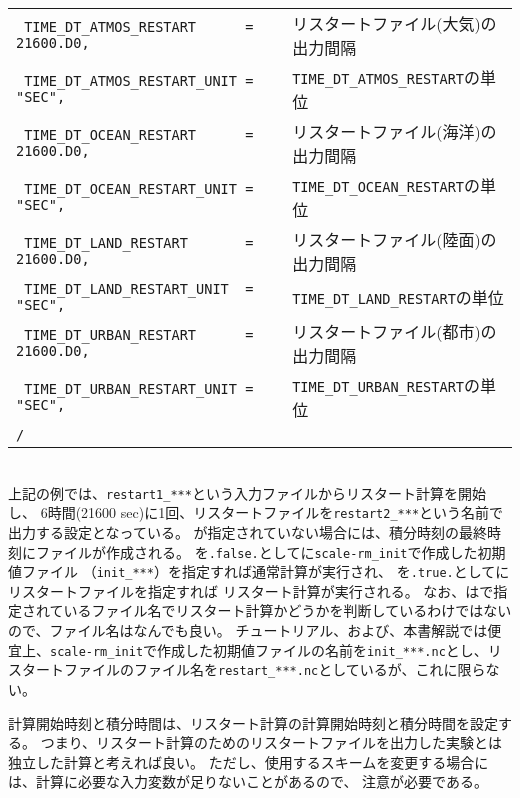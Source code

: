 {{{\begin{tabularx}{150mm}{lX}
\verb| TIME_DT_ATMOS_RESTART      = 21600.D0, | & リスタートファイル(大気)の出力間隔\\
\verb| TIME_DT_ATMOS_RESTART_UNIT = "SEC",    | & \verb|TIME_DT_ATMOS_RESTART|の単位\\
\verb| TIME_DT_OCEAN_RESTART      = 21600.D0, | & リスタートファイル(海洋)の出力間隔\\
\verb| TIME_DT_OCEAN_RESTART_UNIT = "SEC",    | & \verb|TIME_DT_OCEAN_RESTART|の単位\\
\verb| TIME_DT_LAND_RESTART       = 21600.D0, | & リスタートファイル(陸面)の出力間隔\\
\verb| TIME_DT_LAND_RESTART_UNIT  = "SEC",    | & \verb|TIME_DT_LAND_RESTART|の単位\\
\verb| TIME_DT_URBAN_RESTART      = 21600.D0, | & リスタートファイル(都市)の出力間隔\\
\verb| TIME_DT_URBAN_RESTART_UNIT = "SEC",    | & \verb|TIME_DT_URBAN_RESTART|の単位\\
\verb|/| & \\
\end{tabularx}
}}}\\

上記の例では、\verb|restart1_***|という入力ファイルからリスタート計算を開始し、
6時間(21600 sec)に1回、リスタートファイルを\verb|restart2_***|という名前で出力する設定となっている。
が指定されていない場合には、積分時刻の最終時刻にファイルが作成される。
を\verb|.false.|としてに\verb|scale-rm_init|で作成した初期値ファイル
（\verb|init_***|）を指定すれば通常計算が実行され、
を\verb|.true.|としてにリスタートファイルを指定すれば
リスタート計算が実行される。
なお、\scalerm はで指定されているファイル名でリスタート計算かどうかを判断しているわけではないので、ファイル名はなんでも良い。
チュートリアル、および、本書解説では便宜上、\verb|scale-rm_init|で作成した初期値ファイルの名前を\verb|init_***.nc|とし、リスタートファイルのファイル名を\verb|restart_***.nc|としているが、これに限らない。

計算開始時刻と積分時間は、リスタート計算の計算開始時刻と積分時間を設定する。
つまり、リスタート計算のためのリスタートファイルを出力した実験とは独立した計算と考えれば良い。
ただし、使用するスキームを変更する場合には、計算に必要な入力変数が足りないことがあるので、
注意が必要である。

